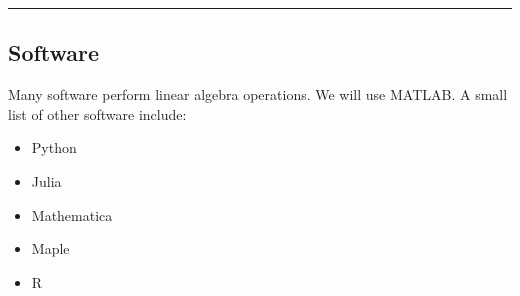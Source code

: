 
 












\rule[0.01in]{\textwidth}{0.0025in}



%
%

\subsection*{Software}
Many software perform linear algebra operations.  We will use MATLAB.  A small list of other software include:
\begin{itemize}
	\item Python
	\item Julia
	\item Mathematica
	\item Maple
	\item R
\end{itemize}







